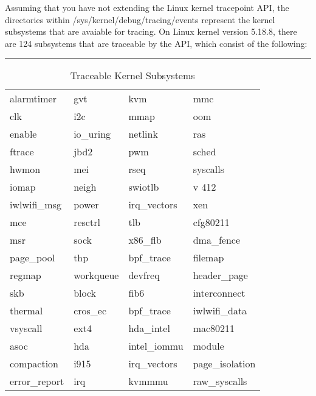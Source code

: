 \documentclass{report}
\begin{document}
\begin{spacing}{1.5}
{\large
Assuming that you have not extending the Linux kernel tracepoint API, the directories within /sys/kernel/debug/tracing/events represent the kernel subsystems that are avaiable for tracing. On Linux kernel version 5.18.8, there are 124 subsystems that are traceable by the API, which consist of the following:
\leavevmode\newline
}

{\large
\noindent\rule{15.5cm}{0.4pt}
\begin{longtable}{llll}
\caption{Traceable Kernel Subsystems} \\
alarmtimer                  & gvt              & kvm              & mmc \\
clk                         & i2c              & mmap             & oom \\ 
enable                      & io\_uring         & netlink          & ras \\
ftrace                      & jbd2             & pwm              & sched \\
hwmon                       & mei              & rseq             & syscalls \\
iomap                       & neigh            & swiotlb          & v 412 \\
iwlwifi\_msg                 & power            & irq\_vectors      & xen \\
mce                         & resctrl          & tlb              & cfg80211 \\
msr                         & sock             & x86\_flb          & dma\_fence \\
page\_pool                   & thp              & bpf\_trace        & filemap \\
regmap                      & workqueue        & devfreq          & header\_page \\
skb                         & block            & fib6             & interconnect \\
thermal                     & cros\_ec          & bpf\_trace        & iwlwifi\_data \\
vsyscall                    & ext4             & hda\_intel        & mac80211 \\
asoc                        & hda              & intel\_iommu      & module \\
compaction                  & i915             & irq\_vectors      & page\_isolation \\
error\_report                & irq              & kvmmmu           & raw\_syscalls \\

\end{longtable}}
\end{spacing}
\end{document}
